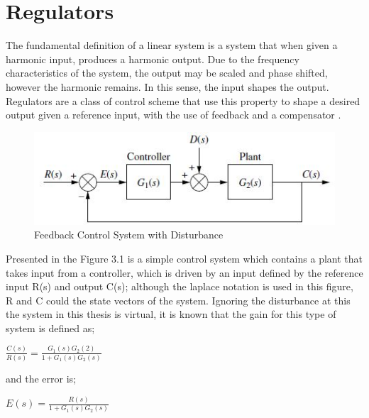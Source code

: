 \documentclass[12pt,openany,a4paper]{book}
\begin{document}
\section{Regulators}
The fundamental definition of a linear system is a system that when given a harmonic input, produces a harmonic output. Due to the frequency characteristics of the system, the output may be scaled and phase shifted, however the harmonic remains. In this sense, the input shapes the output. Regulators are a class of control scheme that use this property to shape a desired output given a reference input, with the use of feedback and a compensator \cite{Nise}.
\\
\begin{center}
\begin{figure}[htb]
  \includegraphics[width=\linewidth]{feedback_control.jpg}
\caption{Feedback Control System with Disturbance}
\end{figure}
\end{center}

 Presented in the Figure 3.1 is a simple control system which contains a plant that takes input from a controller, which is driven by an input defined by the reference input R(s) and output C(s); although the laplace notation is used in this figure, R and C could the state vectors of the system. Ignoring the disturbance at this the system in this thesis is virtual, it is known that the gain for this type of system is defined as;

\vspace{\baselineskip}
\begin{center}
$\frac{C(s)}{R(s)} = \frac{G_1(s) G_2(2)}{ 1 + G_1(s) G_2 (s)}$
\end{center}
\vspace{\baselineskip}

and the error is;

\vspace{\baselineskip}
\begin{center}
$E(s) = \frac{R(s)}{1 + G_1(s) G_2(s)}$
\end{center}
\end{document}
